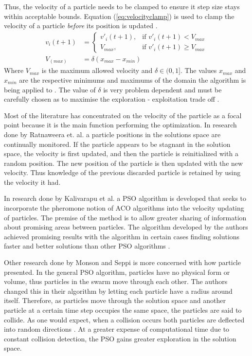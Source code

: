Thus, the velocity of a particle needs to be clamped to ensure it step size stays within acceptable bounds. Equation (\ref{eq:velocityclamp}) is used to clamp the velocity of a particle \emph{before} its position is updated \cite{FundamentalSwarm}.
\begin{align}
	v_i(t+1) &=
	\begin{cases}
	v'_i(t+1), &\text{if $v'_i(t+1) < V_{max}$}\\
	V_{max}, &\text{if $v'_i(t+1) \geq V_{max}$}
	\end{cases} \label{eq:velocityclamp}\\
	V_(max) &= \delta(x_{max} - x_{min})
\end{align}
Where $V_{max}$ is the maximum allowed velocity and $\delta \in (0,1]$. The values $x_{max}$ and $x_{min}$ are the respective minimums and maximums of the domain the algorithm is being applied to \cite{FundamentalSwarm}. The value of $\delta$ is very problem dependent and must be carefully chosen as to maximise the exploration - exploitation trade off \cite{FundamentalSwarm}. 

Most of the literature has concentrated on the velocity of the particle as a focal point because it is the main function performing the optimization. In research done by Ratnaweera et. al.\cite{PSOSelfHierarch} a particle positions in the solutions space are continually monitored. If the particle appears to be stagnant in the solution space, the velocity is first updated, and then the particle is reinitialized with a random position. The new position of the particle is then updated with the new velocity. Thus knowledge of the previous discarded particle is retained by using the velocity it had\cite{PSOSelfHierarch}.

In research done by Kalivarapu et al. \cite{PSOPheromones} a PSO algorithm is developed that seeks to incorporate the pheromone notion of ACO algorithms into the velocity updating of particles. The premise of the method is to allow greater sharing of information about promising areas between particles. The algorithm developed by the authors achieved promising results with the algorithm in certain cases finding solutions faster and better solutions than other PSO algorithms \cite{PSOPheromones}. 

Other research done by Monson and Seppi \cite{adaptPSO} is more concerned with how particle presented. In the general PSO algorithm, particles have no physical form or volume, thus particles in the swarm move through each other. The authors changed this in their algorithm by letting each particle have a radius around itself. Therefore, as particles move through the solution space and another particle at a certain time step occupies the same space, the particles are said to collide. As one would expect, when a collision occurs both particles are deflected into random directions \cite{adaptPSO}. At a greater expense of computational time due to constant collision detection, the PSO gains greater exploration in the solution space. 

